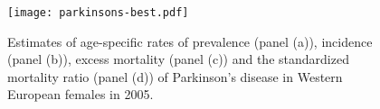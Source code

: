     \begin{figure}[h]
        \begin{center}
            \texttt{[image: parkinsons-best.pdf]}
            \caption{Estimates of age-specific rates of 
              prevalence (panel (a)), incidence (panel (b)),
              excess mortality (panel (c)) and the
              standardized mortality ratio (panel (d)) of Parkinson's
              disease in Western European females in 2005.}
            \label{fig:intro-parkinsons fit}
        \end{center}
    \end{figure}
